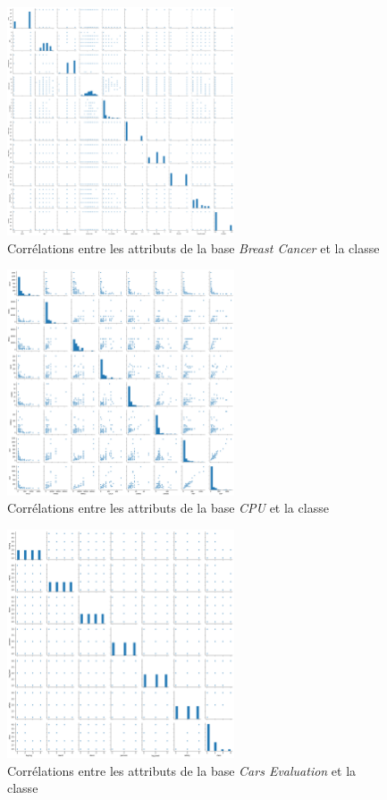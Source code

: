 \documentclass[a4paper]{article}
\begin{document}
\begin{figure}[H]
	\center 
	\includegraphics[width=0.6\textwidth]{images/breast-cancer.png}
    \caption{Corrélations entre les attributs de la base \emph{Breast Cancer}
    et la classe}
    \label{img:breast-cancer}
\end{figure}

\begin{figure}[H]
	\center 
	\includegraphics[width=0.6\textwidth]{images/cpu.png}
    \caption{Corrélations entre les attributs de la base \emph{CPU}
    et la classe}
    \label{img:cpu}
\end{figure}

\begin{figure}[H]
	\center 
	\includegraphics[width=0.6\textwidth]{images/cars.png}
    \caption{Corrélations entre les attributs de la base \emph{Cars Evaluation}
    et la classe}
    \label{img:cars}
\end{figure}
\end{document}
